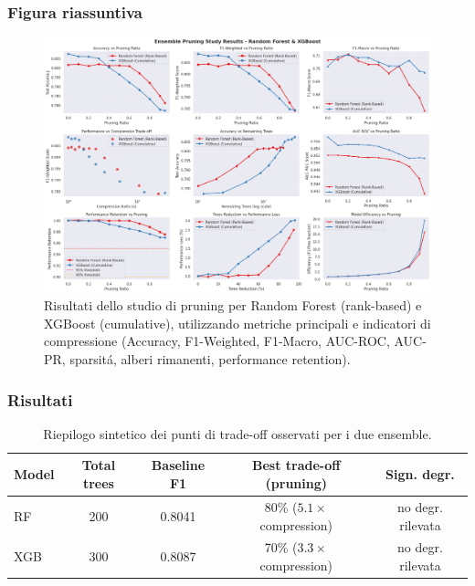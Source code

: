 \documentclass[a4paper,12pt]{report}
\begin{document}
	\subsubsection{Figura riassuntiva}
	\begin{figure}[H]
		\centering
		\includegraphics[width=\textwidth]{img/abl_xgbvsrf_pm.png}
		\caption{Risultati dello studio di pruning per Random Forest (rank-based) e XGBoost (cumulative), utilizzando metriche principali e indicatori di compressione (Accuracy, F1-Weighted, F1-Macro, AUC-ROC, AUC-PR, sparsitá, alberi rimanenti, performance retention).}
	\end{figure}
	
	\subsubsection{Risultati}
	\begin{table}[H]
		\centering
		\setlength{\tabcolsep}{4pt}
		\begin{tabular}{lcccc}
			\toprule
			\textbf{Model} & \textbf{Total trees} & \textbf{Baseline F1} & \textbf{Best trade-off (pruning)} & \textbf{Sign. degr.} \\
			\midrule
			RF     & 200 & 0.8041 & 80\% (\(5.1\times\) compression) & no degr. rilevata \\
			XGB    & 300 & 0.8087 & 70\% (\(3.3\times\) compression) & no degr. rilevata \\
			\bottomrule
		\end{tabular}
		\caption{Riepilogo sintetico dei punti di trade-off osservati per i due ensemble.}
	\end{table}
	
\end{document}
